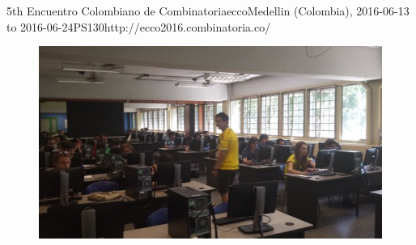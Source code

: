 \begin{event}{5th Encuentro Colombiano de Combinatoria}{ecco}{Medellin (Colombia), 2016-06-13 to 2016-06-24}{PS}{130}{http://ecco2016.combinatoria.co/}
\begin{figure}[ht]
\includegraphics[scale=0.5]{pictures/ECCO-2.jpg}
\end{figure}



\end{event}
